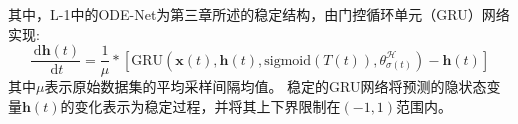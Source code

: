 
其中，L-1中的ODE-Net为第三章所述的稳定结构，由门控循环单元（GRU）网络实现:
\begin{equation}
    \label{equ:dh}
    \frac{\mathrm{~d} \boldsymbol{h}(t)}{\mathrm{~d}t} = \frac{1}{\mu}*\left[\text{GRU}(\boldsymbol{x}(t), \boldsymbol{h}(t),\text{sigmoid}(T(t)), \theta^\mathcal{H}_{\sigma(t)}) - \boldsymbol{h}(t)\right]
\end{equation}
其中$\mu$表示原始数据集的平均采样间隔均值。
稳定的GRU网络将预测的隐状态变量$\boldsymbol{h}(t)$的变化表示为稳定过程，并将其上下界限制在$(-1,1)$范围内。




